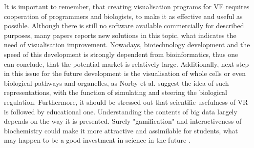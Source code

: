 It is important to remember, that creating visualisation programs for VE requires cooperation of programmers and biologists, to make it as effective and useful as possible. Although there is still no software available commercially for described purposes, many papers reports new solutions in this topic, what indicates the need of visualisation improvement. Nowadays, biotechnology development and the speed of this development is strongly dependent from bioinformatics, thus one can conclude, that the potential market is relatively large. Additionally, next step in this issue for the future development is the visualisation of whole cells or even biological pathways and organelles, as Norby et al. suggest the idea of such representations, with the function of simulating and steering the biological regulation. Furthermore, it should be stressed out that scientific usefulness of VR is followed by educational one. Understanding the contents of big data largely depends on the way it is presented. Surely "gamification" and interactiveness of biochemistry could make it more attractive and assimilable for students, what may happen to be a good investment in science in the future \citep{Norrby15}.  

